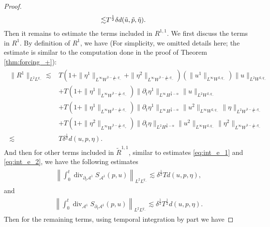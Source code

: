 \documentclass[letterpaper,reqno,10pt,twoside]{amsart}
\theoremstyle{definition}
\theoremstyle{remark}
\def\p{\partial}
\begin{document}
\begin{proof}
\begin{align}{\label{eq:int_e_2}}
				\lesssim& T^{\frac{1}{2}}\delta d(\tilde{u},\tilde{p},\tilde{\eta}).
			\end{align}
			\noindent Then it remains to estimate the terms included in $R^{1,1}$. We first discuss the terms in $R^{1}$. By definition of $R^{1}$, we have (For simplicity, we omitted details here; the estimate is similar to the computation done in the proof of Theorem \ref{thm:forcing_+}):
			\begin{align}
				\begin{aligned}
					\|R^{1}\|_{L^{2}L^{q_{-}}}\lesssim& T(1+\|\eta^{1}\|_{L^{\infty}W^{3-\frac{1}{q_{-}},q_{-}}}+\|\eta^{2}\|_{L^{\infty}W^{3-\frac{1}{q_{-}},q_{-}}})(\|u^{1}\|_{L^{\infty}W^{2,q_{-}}})\|u\|_{L^{2}W^{2,q_{-}}}\\&+T(1+\|\eta^{1}\|_{L^{\infty}W^{3-\frac{1}{q_{-}},q_{-}}})\|\p_{t}\eta^{1}\|_{L^{\infty}H^{\frac{3}{2}-\alpha}}\|u\|_{L^{2}W^{2,q_{-}}}\\
					&+T(1+\|\eta^{1}\|_{L^{\infty}W^{3-\frac{1}{q_{-}},q_{-}}})\|\p_{t}\eta^{1}\|_{L^{\infty}H^{\frac{3}{2}-\alpha}}\|u^{2}\|_{L^{\infty}W^{2,q_{-}}}\|\eta\|_{L^{2}W^{3-\frac{1}{q_{-}},q_{-}}}\\
					&+T(1+\|\eta^{2}\|_{L^{\infty}W^{3-\frac{1}{q_{+}},q_+}})\|\p_{t}\eta\|_{L^{2}H^{\frac{3}{2}-\alpha}}\|u^{2}\|_{L^{\infty}W^{2,q_{-}}}\|\eta^{2}\|_{L^{\infty}W^{3-\frac{1}{q_{-}},q_{-}}}\\
					\lesssim&T\delta^{\frac{1}{2}}d(u,p,\eta).
				\end{aligned}
			\end{align}
			\noindent And then for other terms included in $\tilde R^{1,1}$, similar to estimates \eqref{eq:int_e_1} and \eqref{eq:int_e_2}, we have the following estimates
			\begin{align}
				\begin{aligned}
					&\left\|\int_{0}^{t}\operatorname{div}_{\p_{t}\mathcal{A}^{1}}S_{\mathcal{A}^{1}}(p,u) \right\|_{L^{2}L^{q_{-}}}\lesssim  \delta^{\frac{1}{2}}Td(u,p,\eta),
				\end{aligned}
			\end{align}
			\noindent and
			\begin{align}
				\begin{aligned}
					&\left\|\int_{0}^{t}\operatorname{div}_{\mathcal{A}^{1}}S_{\p_{t}\mathcal{A}^{1}}(p,u) \right\|_{L^{2}L^{q_{-}}}\lesssim  \delta^{\frac{1}{2}}T^{\frac{1}{2}}d(u,p,\eta).
				\end{aligned}
			\end{align}
			Then for the remaining terms, using temporal integration by part we have

\end{proof}
\end{document}
